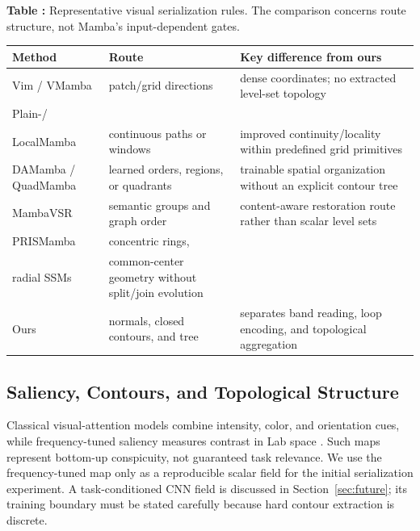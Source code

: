 \begin{center}
\label{tab:comparison}
\begin{minipage}{\columnwidth}
\small\textbf{Table \thetable:} Representative visual serialization rules. The comparison concerns route structure, not Mamba's input-dependent gates.

\vspace{2pt}
\fontsize{7.3pt}{8.0pt}\selectfont
\setlength{\tabcolsep}{2pt}
\begin{tabular}{@{}>{\raggedright\arraybackslash}p{}>{\raggedright\arraybackslash}p{}>{\raggedright\arraybackslash}p{}@{}}
\toprule
Method & Route & Key difference from ours \\
\midrule
Vim / VMamba & patch/grid directions & dense coordinates; no extracted level-set topology \\
Plain-/\\LocalMamba & continuous paths or windows & improved continuity/locality within predefined grid primitives \\
DAMamba / QuadMamba & learned orders, regions, or quadrants & trainable spatial organization without an explicit contour tree \\
MambaVSR & semantic groups and graph order & content-aware restoration route rather than scalar level sets \\
PRISMamba & concentric rings,\\radial SSMs & common-center geometry without split/join evolution \\
Ours & normals, closed contours, and tree & separates band reading, loop encoding, and topological aggregation \\
\bottomrule
\end{tabular}
\end{minipage}
\end{center}

\subsection{Saliency, Contours, and Topological Structure}

Classical visual-attention models combine intensity, color, and orientation cues, while frequency-tuned saliency measures contrast in Lab space \cite{itti1998saliency,achanta2009frequency}. Such maps represent bottom-up conspicuity, not guaranteed task relevance. We use the frequency-tuned map only as a reproducible scalar field for the initial serialization experiment. A task-conditioned CNN field is discussed in Section~\ref{sec:future}; its training boundary must be stated carefully because hard contour extraction is discrete.

